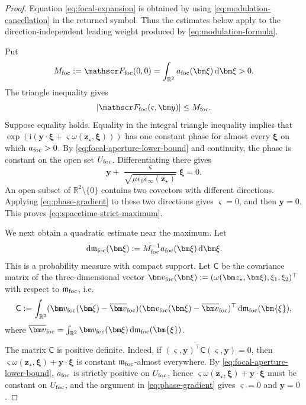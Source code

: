 \documentclass[11pt,reqno]{amsart}
\newcommand{\ii}{\mathrm{i}}
\newcommand{\dd}{\,\mathrm{d}}
\numberwithin{equation}{section}
\begin{document}
\begin{proof}
Equation \eqref{eq:focal-expansion} is obtained by using \eqref{eq:modulation-cancellation} in the returned symbol. Thus the estimates below apply to the direction-independent leading weight produced by \eqref{eq:modulation-formula}.

Put
\begin{equation*}
 M_{\rm foc}:=\mathscr F_{\rm foc}(0,0)=\int_{\mathbb R^2}a_{\rm foc}(\bm\xi)\dd\bm\xi>0.
\end{equation*}
The triangle inequality gives
\begin{equation*}
 |\mathscr F_{\rm foc}(\varsigma,\bm y)|\le M_{\rm foc}.
\end{equation*}
Suppose equality holds. Equality in the integral triangle inequality implies that $\exp(\ii(\bm y\cdot\bm\xi+\varsigma\omega(\bm z_\star,\bm\xi)))$ has one constant phase for almost every $\bm\xi$ on which $a_{\rm foc}>0$. By \eqref{eq:focal-aperture-lower-bound} and continuity, the phase is constant on the open set $U_{\rm foc}$. Differentiating there gives
\begin{equation}\label{eq:phase-gradient}
 \bm y+\frac{\varsigma}{\sqrt{\mu\epsilon_0\epsilon_\infty(\bm z_\star)}}
 \widehat{\bm\xi}=0.
\end{equation}
An open subset of $\mathbb R^2\setminus\{0\}$ contains two covectors with different directions. Applying \eqref{eq:phase-gradient} to these two directions gives $\varsigma=0$, and then $\bm y=0$. This proves \eqref{eq:spacetime-strict-maximum}.

We next obtain a quadratic estimate near the maximum. Let
\begin{equation*}
 \dd\mathfrak m_{\rm foc}(\bm\xi):=M_{\rm foc}^{-1}a_{\rm foc}(\bm\xi)\dd\bm\xi.
\end{equation*}
This is a probability measure with compact support. Let $\mathsf C$ be the covariance matrix of the three-dimensional vector $\bm v_{\rm foc}(\bm\xi):=(\omega(\bm z_\star,\bm\xi),\xi_1,\xi_2)^\top$
with respect to $\mathfrak m_{\rm foc}$, i.e.
$$
    \mathsf C:= \int_{\mathbb{R}^2} (\bm v_{\rm foc}(\bm\xi)-\overline{\bm v}_{\rm foc})(\bm v_{\rm foc}(\bm\xi)-\overline{\bm v}_{\rm foc})^\top\dd\mathfrak m_{\rm foc}(\bm{\xi}),
$$
where $\overline{\bm v}_{\rm foc}=\int_{\mathbb{R}^2}\bm v_{\rm foc}(\bm\xi)\dd\mathfrak m_{\rm foc}(\bm{\xi})$.

The matrix $\mathsf C$ is positive definite. Indeed, if $(\varsigma,\bm y)^{\top}\mathsf C(\varsigma,\bm y)=0$, then $\varsigma\omega(\bm z_\star,\bm\xi)+\bm y\cdot\bm\xi$ is constant
$\mathfrak m_{\rm foc}$-almost everywhere. By \eqref{eq:focal-aperture-lower-bound}, $a_{\rm foc}$ is strictly positive on $U_{\rm foc}$, hence $\varsigma\omega(\bm z_\star,\bm\xi)+\bm y\cdot\bm\xi$ must be constant on $U_{\rm foc}$, and the argument in \eqref{eq:phase-gradient} gives $\varsigma=0$ and $\bm y=0$. 


\end{proof}
\end{document}
